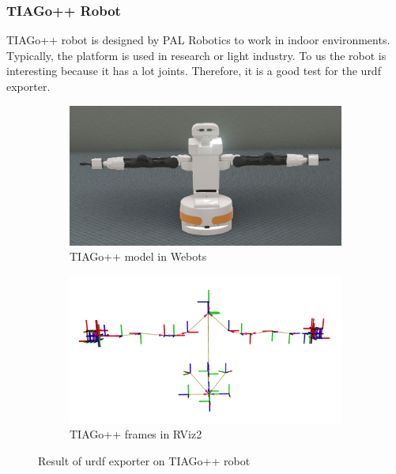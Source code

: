 \subsubsection{TIAGo++ Robot}

TIAGo++ robot is designed by PAL Robotics to work in indoor environments.
Typically, the platform is used in research or light industry.
To us the robot is interesting because it has a lot joints.
Therefore, it is a good test for the \ac{urdf} exporter.

\begin{figure}[H]
\centering
\begin{subfigure}{1\textwidth}
  \centering
  \includegraphics[width=\linewidth]{results/figures/tiago_webots.png}
  \caption{TIAGo++ model in Webots}
  \label{fig:results:map:webots}
\end{subfigure}
\begin{subfigure}{1\textwidth}
  \centering
  \includegraphics[width=\linewidth]{results/figures/tiago_frames.png}
  \caption{TIAGo++ frames in RViz2}
  \label{fig:results:tiago:frames}
\end{subfigure}
\caption{Result of \ac{urdf} exporter on TIAGo++ robot}
\label{fig:results:tiago}
\end{figure}


